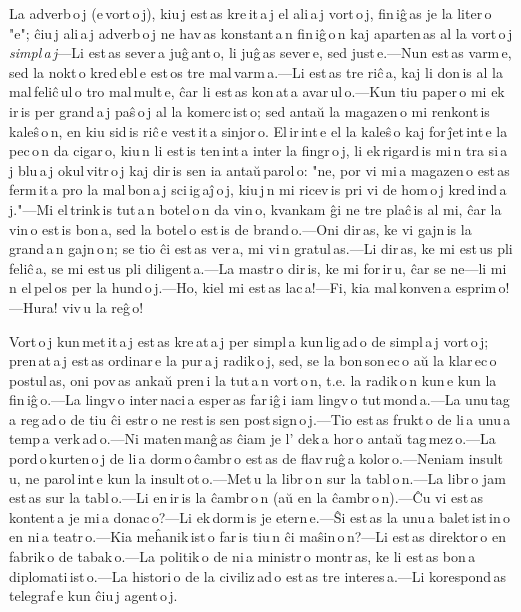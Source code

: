\enlargethispage{-\baselineskip}

La adverb\,o\,j (e\,vort\,o\,j), kiu\,j est\,as kre\,it\,a\,j el ali\,a\,j vort\,o\,j, fin\,iĝ\,as je la liter\,o "e"; ĉiu\,j ali\,a\,j adverb\,o\,j ne hav\,as konstant\,a\,n fin\,iĝ\,o\,n kaj aparten\,as al la vort\,o\,j \emph{simpl\,a\,j}---Li est\,as sever\,a juĝ\,ant\,o, li juĝ\,as sever\,e, sed just\,e.---Nun est\,as varm\,e, sed la nokt\,o kred\,ebl\,e est\,os tre mal\,varm\,a.---Li est\,as tre riĉ\,a, kaj li don\,is al la mal\,feliĉ\,ul\,o tro mal\,mult\,e, ĉar li est\,as kon\,at\,a avar\,ul\,o.---Kun tiu paper\,o mi ek\,ir\,is per grand\,a\,j paŝ\,o\,j al la komerc\,ist\,o; sed antaŭ la magazen\,o mi renkont\,is kaleŝ\,o\,n, en kiu sid\,is riĉ\,e vest\,it\,a sinjor\,o. El\,ir\,int\,e el la kaleŝ\,o kaj for\,ĵet\,int\,e la pec\,o\,n da cigar\,o, kiu\,n li est\,is ten\,int\,a inter la fingr\,o\,j, li ek\,rigard\,is mi\,n tra si\,a\,j blu\,a\,j okul\,vitr\,o\,j kaj dir\,is sen ia antaŭ\,parol\,o: "ne, por vi mi\,a magazen\,o est\,as ferm\,it\,a pro la mal\,bon\,a\,j sci\,ig\,aĵ\,o\,j, kiu\,j\,n mi ricev\,is pri vi de hom\,o\,j kred\,ind\,a\,j."---Mi el\,trink\,is tut\,a\,n botel\,o\,n da vin\,o, kvankam ĝi ne tre plaĉ\,is al mi, ĉar la vin\,o est\,is bon\,a, sed la botel\,o est\,is de brand\,o.---Oni dir\,as, ke vi gajn\,is la grand\,a\,n gajn\,o\,n; se tio ĉi est\,as ver\,a, mi vi\,n gratul\,as.---Li dir\,as, ke mi est\,us pli feliĉ\,a, se mi est\,us pli diligent\,a.---La mastr\,o dir\,is, ke mi for\,ir\,u, ĉar se ne---li mi\,n el\,pel\,os per la hund\,o\,j.---Ho, kiel mi est\,as lac\,a!---Fi, kia mal\,konven\,a esprim\,o!---Hura! viv\,u la reĝ\,o! 



Vort\,o\,j kun\,met\,it\,a\,j est\,as kre\,at\,a\,j per simpl\,a kun\,lig\,ad\,o de simpl\,a\,j vort\,o\,j; pren\,at\,a\,j est\,as ordinar\,e la pur\,a\,j radik\,o\,j, sed, se la bon\,son\,ec\,o aŭ la klar\,ec\,o postul\,as, oni pov\,as ankaŭ pren\,i la tut\,a\,n vort\,o\,n, t.e. la radik\,o\,n kun\,e kun la fin\,iĝ\,o.---La lingv\,o inter\,naci\,a esper\,as far\,iĝ\,i iam lingv\,o tut\,mond\,a.---La unu\,tag\,a reg\,ad\,o de tiu ĉi estr\,o ne rest\,is sen post\,sign\,o\,j.---Tio est\,as frukt\,o de li\,a unu\,a\,temp\,a verk\,ad\,o.---Ni maten\,manĝ\,as ĉiam je l' dek\,a hor\,o antaŭ tag\,mez\,o.---La pord\,o\,kurten\,o\,j de li\,a dorm\,o\,ĉambr\,o est\,as de flav\,ruĝ\,a kolor\,o.---Neniam insult\,u, ne parol\,int\,e kun la insult\,ot\,o.---Met\,u la libr\,o\,n sur la tabl\,o\,n.---La libr\,o jam est\,as sur la tabl\,o.---Li en\,ir\,is la ĉambr\,o\,n (aŭ en la ĉambr\,o\,n).---Ĉu vi est\,as kontent\,a je mi\,a donac\,o?---Li ek\,dorm\,is je etern\,e.---Ŝi est\,as la unu\,a balet\,ist\,in\,o en ni\,a teatr\,o.---Kia meĥanik\,ist\,o far\,is tiu\,n ĉi maŝin\,o\,n?---Li est\,as direktor\,o en fabrik\,o de tabak\,o.---La politik\,o de ni\,a ministr\,o montr\,as, ke li est\,as bon\,a diplomati\,ist\,o.---La histori\,o de la civiliz\,ad\,o est\,as tre interes\,a.---Li korespond\,as telegraf\,e kun ĉiu\,j agent\,o\,j. 


